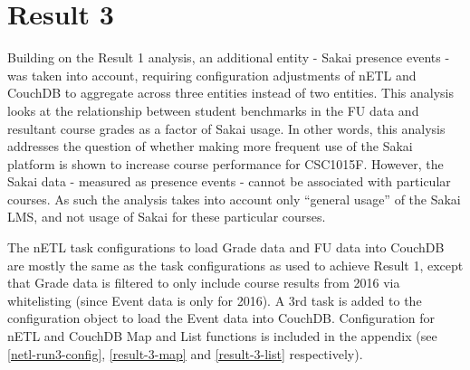 \section{Result 3}
Building on the Result 1 analysis, an additional entity - Sakai presence events - was taken into account, requiring configuration adjustments of nETL and CouchDB to aggregate across three entities instead of two entities. This analysis looks at the relationship between student benchmarks in the FU data and resultant course grades as a factor of Sakai usage. In other words, this analysis addresses the question of whether making more frequent use of the Sakai platform is shown to increase course performance for CSC1015F. However, the Sakai data - measured as presence events - cannot be associated with particular courses. As such the analysis takes into account only ``general usage'' of the Sakai LMS, and not usage of Sakai for these particular courses.

The nETL task configurations to load Grade data and FU data into CouchDB are mostly the same as the task configurations as used to achieve Result 1, except that Grade data is filtered to only include course results from 2016 via whitelisting (since Event data is only for 2016). A 3rd task is added to the configuration object to load the Event data into CouchDB. Configuration for nETL and CouchDB Map and List functions is included in the appendix (see \ref{netl-run3-config}, \ref{result-3-map} and \ref{result-3-list} respectively).

